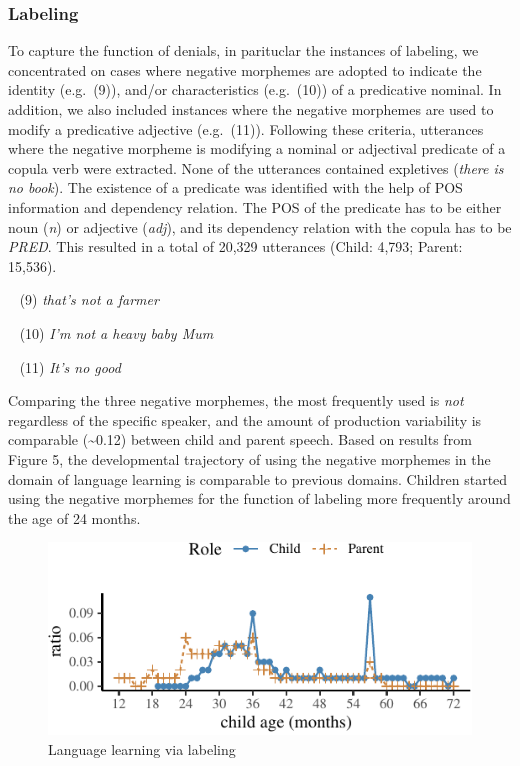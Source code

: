 \documentclass[10pt, letterpaper]{article}
\newenvironment{CodeChunk}{}{}
\begin{document}
\hypertarget{labeling}{%
\subsubsection{Labeling}\label{labeling}}

To capture the function of denials, in parituclar the instances of
labeling, we concentrated on cases where negative morphemes are adopted
to indicate the identity (e.g.~(9)), and/or characteristics (e.g.~(10))
of a predicative nominal. In addition, we also included instances where
the negative morphemes are used to modify a predicative adjective
(e.g.~(11)). Following these criteria, utterances where the negative
morpheme is modifying a nominal or adjectival predicate of a copula verb
were extracted. None of the utterances contained expletives (\emph{there
is no book}). The existence of a predicate was identified with the help
of POS information and dependency relation. The POS of the predicate has
to be either noun (\emph{n}) or adjective (\emph{adj}), and its
dependency relation with the copula has to be \emph{PRED}. This resulted
in a total of 20,329 utterances (Child: 4,793; Parent: 15,536).

~ (9) \emph{that's not a farmer}

~ (10) \emph{I'm not a heavy baby Mum}

~ (11) \emph{It's no good}

Comparing the three negative morphemes, the most frequently used is
\emph{not} regardless of the specific speaker, and the amount of
production variability is comparable (\textasciitilde0.12) between child
and parent speech. Based on results from Figure 5, the developmental
trajectory of using the negative morphemes in the domain of language
learning is comparable to previous domains. Children started using the
negative morphemes for the function of labeling more frequently around
the age of 24 months.

\begin{CodeChunk}
\begin{figure}[H]

{\centering \includegraphics{figs/learning-1} 

}

\caption[Language learning via labeling]{Language learning via labeling}\label{fig:learning}
\end{figure}
\end{CodeChunk}
\end{document}
